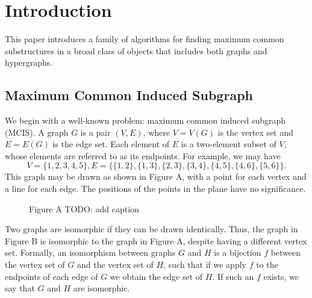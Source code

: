 \chapter{Introduction}
\label{c:intro}


This paper introduces a family of algorithms for finding maximum common
substructures in a broad class of objects that includes both graphs and
hypergraphs.

\section{Maximum Common Induced Subgraph}

We begin with a well-known problem: maximum common induced subgraph (MCIS). A
graph $G$ is a pair $(V, E)$, where $V = V(G)$ is the vertex set and $E = E(G)$
is the edge set. Each element of $E$ is a two-element subset of $V$, whose
elements are referred to as its endpoints. For example, we may have
\[
V = \{1, 2, 3, 4, 5\},
E = \{\{1,2\}, \{1,3\}, \{2,3\}, \{3,4\}, \{4,5\}, \{4,6\}, \{5,6\}\}
.
\]
This graph may be drawn as shown in Figure A, with a point for each
vertex and a line for each edge.  The positions of the points in the plane have
no significance.

\begin{figure}[h!]
\centering
{}
\caption{Figure A TODO: add caption}
\end{figure}

Two graphs are isomorphic if they can be drawn identically. Thus, the graph in
Figure B is isomorphic to the graph in Figure A, despite having a different
vertex set. Formally, an isomorphism between graphs $G$ and $H$ is a bijection $f$
between the vertex set of $G$ and the vertex set of $H$, such that if we apply $f$ to
the endpoints of each edge of $G$ we obtain the edge set of $H$. If such an $f$
exists, we say that $G$ and $H$ are isomorphic.


